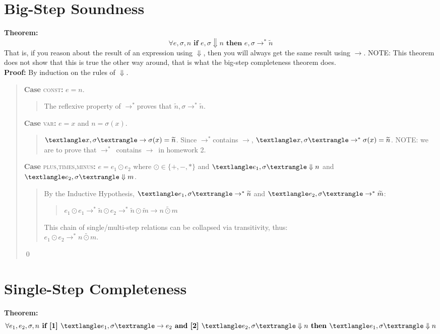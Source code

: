 \documentclass{lecturenotes}
\newcommand{\singlestep}{\ensuremath{\rightarrow}}
\newcommand{\multistep}{\ensuremath{\rightarrow^*}}
\newcommand{\bigstep}{\ensuremath{\Downarrow}}
\newcommand{\config}[1]{\ensuremath{\textlangle #1, \sigma \textrangle}}
\newcommand{\prog}[1]{\ensuremath{\widetilde{#1}}}
\newcommand{\casesc}[3]{
  \textbf{Case} \textsc{#1}\textbf{:} #2
  \begin{quote}
    #3
  \end{quote}
}
\begin{document}
\section{Big-Step Soundness}

\noindent
\textbf{Theorem:}
$$\forall e,\sigma,n \textbf{ if } e,\sigma \bigstep n \textbf{ then } e,\sigma \multistep \prog{n}$$
That is, if you reason about the result of an expression using \bigstep, then you will always get the same result using \singlestep.
NOTE: This theorem does not show that this is true the other way around, that is what the big-step completeness theorem does. \\

\noindent
\textbf{Proof:} By induction on the rules of \bigstep.
\begin{quote}

  \casesc{const}
  {$e = n$.}
  {
    The reflexive property of \multistep proves that $\prog{n},\sigma \multistep \prog{n}$.
  }

  \casesc{var}
  {$e = x$ and $n = \sigma(x)$.}
  {
    $\config{x} \singlestep \sigma(x) = \prog{n}$.
    Since \multistep contains \singlestep, $\config{x} \multistep \sigma(x) = \prog{n}$.
    NOTE: we are to prove that \multistep\ contains \singlestep\ in homework 2.
  }

  \casesc{plus,times,minus}
  {$e = e_1 \odot e_2$ where $\odot \in \{+,-,*\}$ and $\config{e_1} \bigstep n$ and $\config{e_2} \bigstep m$.}
  {
    By the Inductive Hypothesis, $\config{e_1} \multistep \prog{n}$ and $\config{e_2} \multistep \prog{m}$:
    \begin{quote}
      $e_1 \odot e_1 \multistep \prog{n} \odot e_2 \multistep \prog{n} \odot \prog{m} \singlestep \prog{n \odot m}$ \\
    \end{quote}
    This chain of single/multi-step relations can be collapsed via transitivity, thus: \\
    $e_1 \odot e_2 \multistep \prog{n \odot m}$.
  }

  \qed
\end{quote}

\section{Single-Step Completeness}

\textbf{Theorem:}
$$\forall e_1,e_2,\sigma,n \textbf{ if [1] } \config{e_1} \singlestep e_2 \textbf{ and [2] } \config{e_2} \bigstep n \textbf{ then } \config{e_1} \bigstep n$$
\end{document}
